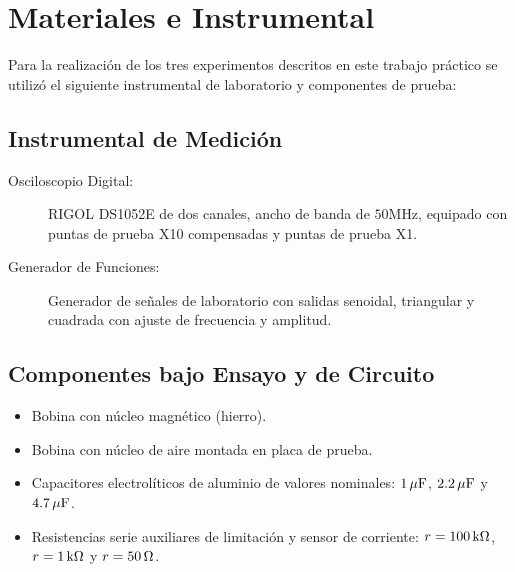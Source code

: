 \chapter{Materiales e Instrumental}

Para la realización de los tres experimentos descritos en este trabajo práctico se utilizó el siguiente instrumental
de laboratorio y componentes de prueba:

\section{Instrumental de Medición}
\begin{description}
    \item[Osciloscopio Digital:] RIGOL DS1052E de dos canales, ancho de banda de $50\si{\mega\hertz}$, equipado con puntas
    de prueba X10 compensadas y puntas de prueba X1.
    \item[Generador de Funciones:] Generador de señales de laboratorio con salidas senoidal, triangular y
    cuadrada con ajuste de frecuencia y amplitud.
\end{description}

\section{Componentes bajo Ensayo y de Circuito}
\begin{itemize}
    \item Bobina con núcleo magnético (hierro).
    \item Bobina con núcleo de aire montada en placa de prueba.
    \item Capacitores electrolíticos de aluminio de valores nominales: $1\uF$, $2.2\uF$ y $4.7\uF$.
    \item Resistencias serie auxiliares de limitación y sensor de corriente: $r = 100\kohm$, $r = 1\kohm$ y $r = 50\ohm$.
\end{itemize}
